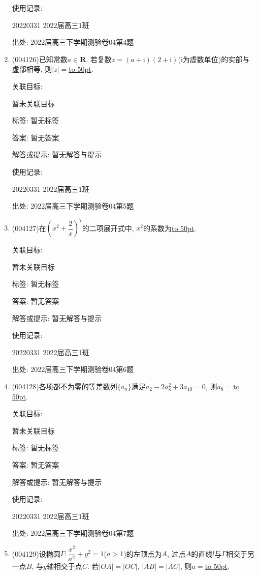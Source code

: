 \documentclass[10pt,a4paper]{article}
\newcommand{\blank}[1]{\underline{\hbox to #1pt{}}}
\begin{document}
\begin{enumerate}[1.]
使用记录:

20220331	2022届高三1班	


出处: 2022届高三下学期测验卷04第4题
\item { (004126)}已知常数$a\in \mathbf{R}$, 若复数$z=(a+\mathrm{i})(2+\mathrm{i})$($\mathrm{i}$为虚数单位)的实部与虚部相等, 则$|z|=$\blank{50}.


关联目标:

暂未关联目标



标签: 暂无标签

答案: 暂无答案

解答或提示: 暂无解答与提示

使用记录:

20220331	2022届高三1班	


出处: 2022届高三下学期测验卷04第5题
\item { (004127)}在$(x^2+\dfrac 2x)^7$的二项展开式中, $x^2$的系数为\blank{50}.


关联目标:

暂未关联目标



标签: 暂无标签

答案: 暂无答案

解答或提示: 暂无解答与提示

使用记录:

20220331	2022届高三1班	


出处: 2022届高三下学期测验卷04第6题
\item { (004128)}各项都不为零的等差数列$\{a_n\}$满足$a_2-2a_8^2+3a_{10}=0$, 则$a_8=$\blank{50}.


关联目标:

暂未关联目标



标签: 暂无标签

答案: 暂无答案

解答或提示: 暂无解答与提示

使用记录:

20220331	2022届高三1班	


出处: 2022届高三下学期测验卷04第7题
\item { (004129)}设椭圆$\Gamma:\dfrac{x^2}{a^2}+y^2=1$($a>1$)的左顶点为$A$, 过点$A$的直线$l$与$\Gamma$相交于另一点$B$, 与$y$轴相交于点$C$. 若$|OA|=|OC|$, $|AB|=|AC|$, 则$a=$\blank{50}.



\end{enumerate}
\end{document}
